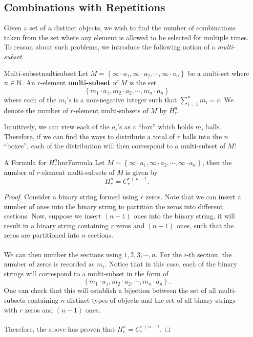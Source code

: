 \documentclass[math]{amznotes}
\theoremstyle{remark}
\begin{document}
\subsection{Combinations with Repetitions}
Given a set of $n$ distinct objects, we wish to find the number of combinations taken from the set where any element is allowed to be selected for multiple times. To reason about such problems, we introduce the following notion of a \textit{multi-subset}.
\begin{dfnbox}{Multi-subset}{multisubset}
    Let $M = \left\{\infty \cdot a_1, \infty \cdot a_2, \cdots, \infty \cdot a_n\right\}$ be a multi-set where $n \in \mathbb{N}$. An $r$-element {\color{red} \textbf{multi-subset}} of $M$ is the set
    \begin{displaymath}
        \left\{m_1 \cdot a_1, m_2 \cdot a_2, \cdots, m_n \cdot a_n\right\}
    \end{displaymath}
    where each of the $m_i$'s is a non-negative integer such that $\sum_{i = 1}^{n}m_i = r$. We denote the number of $r$-element multi-subsets of $M$ by $H^n_r$.
\end{dfnbox}
Intuitively, we can view each of the $a_i$'s as a ``box'' which holds $m_i$ balls. Therefore, if we can find the ways to distribute a total of $r$ balls into the $n$ ``boxes'', each of the distribution will then correspond to a multi-subset of $M$!
\begin{probox}{A Formula for $H^n_r$}{hnrFormula}
    Let $M = \left\{\infty \cdot a_1, \infty \cdot a_2, \cdots, \infty \cdot a_n\right\}$, then the number of $r$-element multi-subsets of $M$ is given by
    \begin{equation*}
        H^n_r = C^{r + n - 1}_r.
    \end{equation*}
    \tcblower
    \begin{proof}
        Consider a binary string formed using $r$ zeros. Note that we can insert a number of ones into the binary string to partition the zeros into different sections. Now, suppose we insert $(n - 1)$ ones into the binary string, it will result in a binary string containing $r$ zeros and $(n - 1)$ ones, such that the zeros are partitioned into $n$ sections.
        \\\\
        We can then number the sections using $1, 2, 3, \cdots, n$. For the $i$-th section, the number of zeros is recorded as $m_i$. Notice that in this case, each of the binary strings will correspond to a multi-subset in the form of 
        \begin{displaymath}
            \left\{m_1 \cdot a_1, m_2 \cdot a_2, \cdots, m_n \cdot a_n\right\}.
        \end{displaymath}
        One can check that this will establish a bijection between the set of all multi-subsets containing $n$ distinct types of objects and the set of all binary strings with $r$ zeros and $(n - 1)$ ones.
        \\\\
        Therefore, the above has proven that $H^n_r = C^{r + n - 1}_r$.
    \end{proof}
\end{probox}
\end{document}
